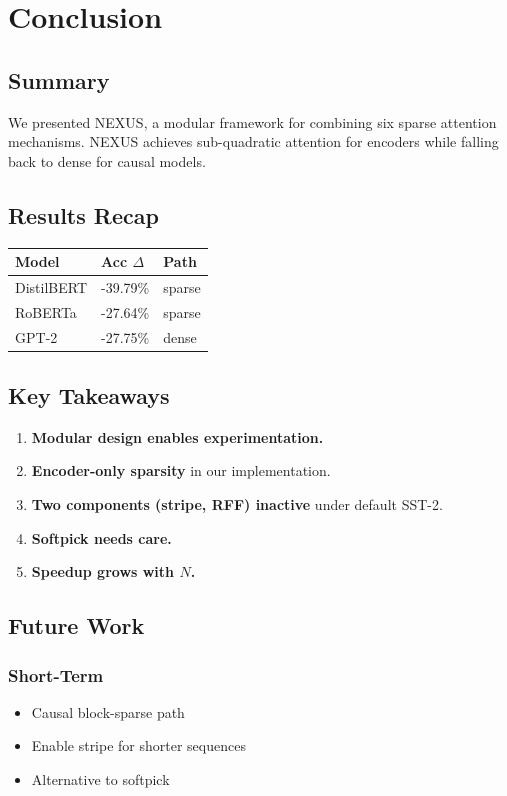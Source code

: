 \section{Conclusion}

\subsection{Summary}

We presented NEXUS, a modular framework for combining six sparse attention 
mechanisms. NEXUS achieves sub-quadratic attention for encoders while 
falling back to dense for causal models.

\subsection{Results Recap}

\begin{table}[H]
\centering
\small
\begin{tabular}{lll}
\toprule
\textbf{Model} & \textbf{Acc $\Delta$} & \textbf{Path} \\
\midrule
DistilBERT & -39.79\% & sparse \\
RoBERTa & -27.64\% & sparse \\
GPT-2 & -27.75\% & dense \\
\bottomrule
\end{tabular}
\end{table}

\subsection{Key Takeaways}

\begin{enumerate}
\item \textbf{Modular design enables experimentation.}
\item \textbf{Encoder-only sparsity} in our implementation.
\item \textbf{Two components (stripe, RFF) inactive} under default SST-2.
\item \textbf{Softpick needs care.}
\item \textbf{Speedup grows with $N$.}

\end{enumerate}
\subsection{Future Work}

\subsubsection{Short-Term}
\begin{itemize}
\item Causal block-sparse path
\item Enable stripe for shorter sequences
\item Alternative to softpick

\end{itemize}
